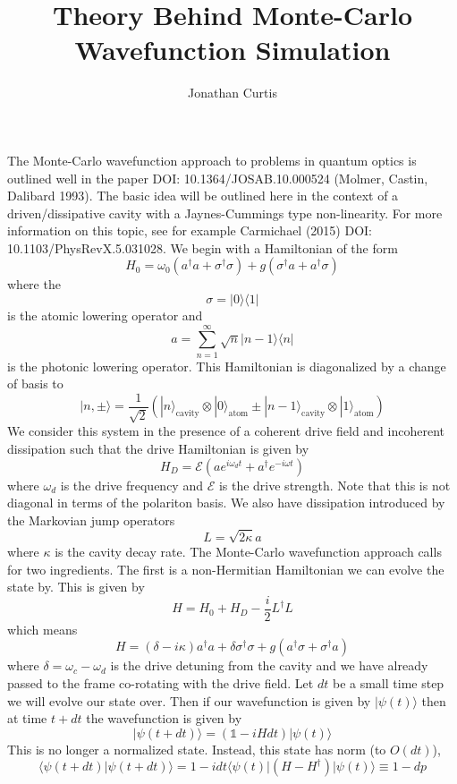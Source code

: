 \documentclass[11pt, oneside]{article}
\title{Theory Behind Monte-Carlo Wavefunction Simulation}
\author{Jonathan Curtis}
\begin{document}
\maketitle

The Monte-Carlo wavefunction approach to problems in quantum optics is outlined well in the paper DOI: 10.1364/JOSAB.10.000524 (Molmer, Castin, Dalibard 1993). The basic idea will be outlined here in the context of a driven/dissipative cavity with a Jaynes-Cummings type non-linearity. For more information on this topic, see for example Carmichael (2015) DOI: 10.1103/PhysRevX.5.031028.  We begin with a Hamiltonian of the form 
\[
H_0 = \omega_0(a^\dagger a + \sigma^\dagger \sigma) + g(\sigma^\dagger a + a^\dagger \sigma)
\]
where the 
\[
\sigma = |0\rangle \langle 1| 
\]
is the atomic lowering operator and 
\[
a = \sum_{n=1}^{\infty} \sqrt{n}|n-1\rangle \langle n|
\]
is the photonic lowering operator. This Hamiltonian is diagonalized by a change of basis to 
\[
|n,\pm\rangle = \frac{1}{\sqrt{2}}\left(|n\rangle_{\textrm{cavity}}\otimes |0\rangle_{\textrm{atom}} \pm |n-1\rangle_{\textrm{cavity}}\otimes|1\rangle_{\textrm{atom}}\right)
\]
We consider this system in the presence of a coherent drive field and incoherent dissipation such that the drive Hamiltonian is given by 
\[
H_{D} = \mathcal{E} \left(a e^{i\omega_d t} + a^\dagger e^{-i\omega t}\right)
\]
where $\omega_d$ is the drive frequency and $\mathcal{E}$ is the drive strength. Note that this is not diagonal in terms of the polariton basis. We also have dissipation introduced by the Markovian jump operators 
\[
L = \sqrt{2\kappa} a
\]
where $\kappa$ is the cavity decay rate. The Monte-Carlo wavefunction approach calls for two ingredients. The first is a non-Hermitian Hamiltonian we can evolve the state by. This is given by 
\[
H = H_0 +H_D -\frac{i}{2} L^\dagger L
\]
which means 
\[
H = (\delta - i\kappa)a^\dagger a + \delta \sigma^\dagger \sigma + g(a^\dagger \sigma + \sigma^\dagger a)
\]
where $\delta =\omega_c - \omega_d$ is the drive detuning from the cavity and we have already passed to the frame co-rotating with the drive field. Let $dt$ be a small time step we will evolve our state over. Then if our wavefunction is given by $|\psi(t)\rangle$ then at time $t+dt$ the wavefunction is given by 
\[
|\psi(t+dt)\rangle = \left(\mathds{1} - iHdt\right)|\psi(t)\rangle
\]
This is no longer a normalized state. Instead, this state has norm (to $O(dt)$), 
\[
\langle \psi(t+dt)| \psi(t+dt)\rangle = 1 -idt \langle \psi(t) | (H-H^\dagger)|\psi(t)\rangle \equiv 1 - dp 
\]
 


  
\end{document}
